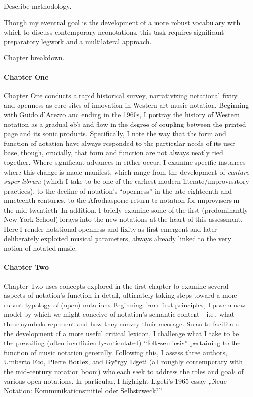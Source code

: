 \begin{notestuff}
    Describe methodology.
\end{notestuff}
Though my eventual goal is the development of a more robust vocabulary with which to discuss contemporary neonotations, this task requires significant preparatory legwork and a multilateral approach.

\begin{notestuff}
    Chapter breakdown.
\end{notestuff}
\paragraph{Chapter One} %
Chapter One conducts a rapid historical survey, narrativizing notational fixity and openness as core sites of innovation in Western art music notation. 
Beginning with Guido d'Arezzo and ending in the 1960s, I portray the history of Western notation as a gradual ebb and flow in the degree of coupling between the printed page and its sonic products. 
Specifically, I note the way that the form and function of notation have always responded to the particular needs of its user-base, though, crucially, that form and function are not always neatly tied together.
Where significant advances in either occur, I examine specific instances where this change is made manifest, which range from the development of \textit{cantare super librum} (which I take to be one of the earliest modern literate/improvisatory practices), to the decline of notation's ``openness'' in the late-eighteenth and nineteenth centuries, to the Afrodiasporic return to notation for improvisers in the mid-twentieth.
In addition, I briefly examine some of the first (predominantly New York School) forays into the new notations at the heart of this assessment. 
Here I render notational openness and fixity as first emergent and later deliberately exploited musical parameters, always already linked to the very notion of notated music.

\paragraph{Chapter Two}
Chapter Two uses concepts explored in the first chapter to examine several aspects of notation's function in detail, ultimately taking steps toward a more robust typology of (open) notations
Beginning from first principles, I pose a new model by which we might conceive of notation's semantic content---i.e., what these symbols represent and how they convey their message.
So as to facilitate the development of a more useful critical lexicon, I challenge what I take to be the prevailing (often insufficiently-articulated) ``folk-semiosis'' pertaining to the function of music notation generally.
Following this, I assess three authors, Umberto Eco, Pierre Boulez, and Gy\"{o}rgy Ligeti (all roughly contemporary with the mid-century notation boom) who each seek to address the roles and goals of various open notations. 
In particular, I highlight Ligeti's 1965 essay „Neue Notation: Kommunikationsmittel oder Selbstzweck?” 

